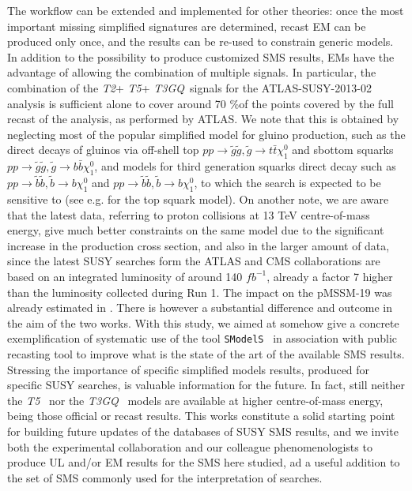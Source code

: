 \documentclass[a4paper,11pt]{article}
\newcommand{\SMO}{\texttt{SModelS\xspace}}
\newcommand{\TGQ}{ \textit{T3GQ}}
\newcommand{\Ttwo}{ \textit{T2}}
\newcommand{\Tfive}{ \textit{T5}}
\begin{document}
The workflow can be extended and implemented for other theories: once the most important missing simplified signatures are determined, recast EM can be produced only once, and the results can be re-used to constrain generic models. In addition to the possibility to produce customized SMS results, EMs have the advantage of allowing the combination of multiple signals. In particular, the combination of the \Ttwo+\Tfive+\TGQ~signals for the ATLAS-SUSY-2013-02 analysis is sufficient alone to cover around 70 $\%$of the points covered by the full recast of the analysis, as performed by ATLAS. We note that this is obtained by neglecting most of the popular simplified model for gluino production, such as the direct decays of gluinos via off-shell top $pp \rightarrow \tilde g \tilde g, \tilde g \rightarrow t \bar t \chi _1 ^0$ and sbottom squarks $pp \rightarrow \tilde g \tilde g, \tilde g \rightarrow b \bar b \chi _1 ^0$, and models for third generation squarks direct decay such as $pp \rightarrow \tilde b \tilde b, \tilde b \rightarrow b \chi _1 ^0$ and $pp \rightarrow \tilde b \tilde b, \tilde b \rightarrow b \chi _1 ^0$, to which the search is expected to be sensitive to (see e.g. \cite{Kraml:2016eti} for the top squark model). 
On another note, we are aware that the latest data, referring to proton collisions at 13 TeV centre-of-mass energy, give much better constraints on the same model due to the significant increase in the production cross section, and also in the larger amount of data, since the latest SUSY searches form the ATLAS and CMS collaborations are based on an integrated luminosity of around 140 $fb^{-1}$, already a factor 7 higher than the luminosity collected during Run 1. The impact on the pMSSM-19 was already estimated in \cite{Dutta:2018ioj}. There is however a substantial difference and outcome in the aim of the two works. With this study, we aimed at somehow give a concrete exemplification of systematic use of the tool \SMO~ in association with public recasting tool to improve what is the state of the art of the available SMS results. Stressing the importance of specific simplified models results, produced for specific SUSY searches, is valuable information for the future. In fact, still neither the \Tfive~ nor the \TGQ~ models are available at higher centre-of-mass energy, being those official or recast results. This works constitute a solid starting point for building future updates of the databases of SUSY SMS results, and we invite both the experimental collaboration and our colleague phenomenologists to produce UL and/or EM results for the SMS here studied, ad a useful addition to the set of SMS commonly used for the interpretation of searches.
%
\end{document}
